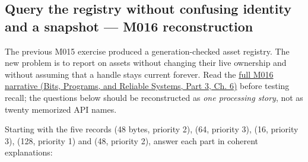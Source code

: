 \subsection{Query the registry without confusing identity and a snapshot --- M016 reconstruction}\label{appendix-960160274237-query-the-registry-without-confusing-identity-and-a-snapshot-m016-reconstruction}

\hypertarget{appendix-960160274237-query-the-registry-without-confusing-identity-and-a-snapshot-m016-reconstruction}{}

The previous M015 exercise produced a generation-checked asset registry. The new problem is to report on assets without changing their live ownership and without assuming that a handle stays current forever. Read the \href{../01-Bits-Programs-and-Reliable-Systems-P03/main.pdf\#nameddest=01-foundations-i-ch006-from-a-living-asset-registry-to-reliable-queries-and-transformations}{full M016 narrative (Bits, Programs, and Reliable Systems, Part 3, Ch. 6)} before testing recall; the questions below should be reconstructed as \emph{one processing story}, not as twenty memorized API names.


Starting with the five records  (48 bytes, priority 2),  (64, priority 3),  (16, priority 3),  (128, priority 1) and  (48, priority 2), answer each part in coherent explanations:

